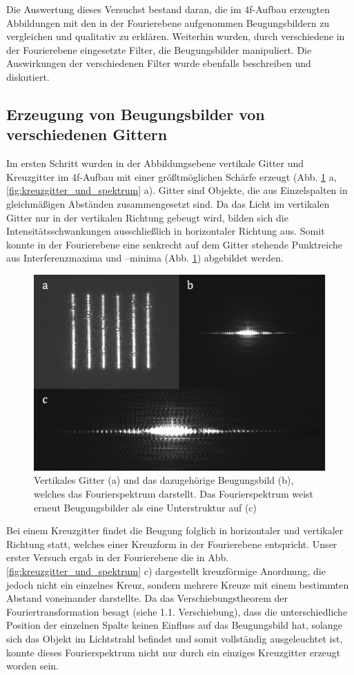 

Die Auswertung dieses Versuchst bestand daran, die im 4f-Aufbau erzeugten Abbildungen mit den in der Fourierebene aufgenommen Beugungsbildern zu vergleichen und qualitativ zu erklären. Weiterhin wurden, durch verschiedene  in der Fourierebene eingesetzte Filter, die Beugungsbilder manipuliert. Die Auswirkungen der verschiedenen Filter wurde ebenfalls beschreiben und diskutiert.

\subsection{Erzeugung von Beugungsbilder von verschiedenen Gittern}

Im ersten Schritt wurden in der Abbildungsebene vertikale Gitter und Kreuzgitter im 4f-Aufbau mit einer größtmöglichen Schärfe erzeugt (Abb. \ref{fig:gitter_und_spektrum} a, \ref{fig:kreuzgitter_und_spektrum} a). Gitter sind Objekte, die aus Einzelspalten in gleichmäßigen Abständen zusammengesetzt sind. Da das Licht im vertikalen Gitter nur in der vertikalen Richtung gebeugt wird, bilden sich die Intensitätsschwankungen ausschließlich in horizontaler Richtung aus. Somit konnte in der Fourierebene eine senkrecht auf dem Gitter stehende Punktreiche aus Interferenzmaxima und –minima (Abb. \ref{fig:gitter_und_spektrum}) abgebildet werden. 

\begin{figure}[h]
	\centering
	\includegraphics[width=0.10\linewidth]{Regina/abb13}
	\caption[Gitter mit Fourierspektrum]{Vertikales Gitter (a) und das dazugehörige Beugungsbild (b), welches das Fourierspektrum darstellt. Das Fourierspektrum weist erneut Beugungsbilder als eine Unterstruktur auf (c)}
	\label{fig:gitter_und_spektrum}
\end{figure}


Bei einem Kreuzgitter findet die Beugung folglich in horizontaler und vertikaler Richtung statt, welches einer Kreuzform in der Fourierebene entspricht. Unser erster Versuch ergab in
der Fourierebene die in Abb. \ref{fig:kreuzgitter_und_spektrum} c) dargestellt kreuzförmige Anordnung, die jedoch nicht ein einzelnes Kreuz, sondern mehrere Kreuze mit einem bestimmten Abstand voneinander
darstellte. Da das Verschiebungstheorem der Fouriertransformation besagt (siehe 1.1. Verschiebung), dass die unterschiedliche Position der einzelnen Spalte keinen Einfluss auf das Beugungsbild hat, solange sich das Objekt im Lichtstrahl befindet und somit vollständig ausgeleuchtet ist, konnte dieses Fourierspektrum nicht nur durch ein einziges Kreuzgitter erzeugt worden sein. 

